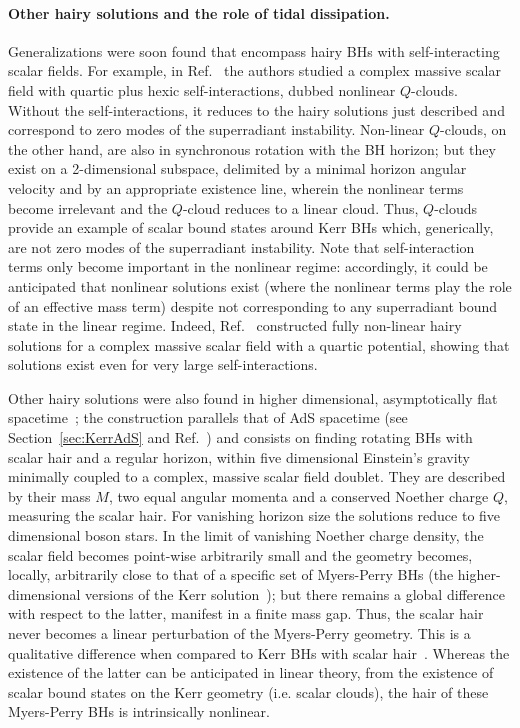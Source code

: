 \documentclass[11pt]{article}
\numberwithin{equation}{section} %
\begin{document}
\paragraph{Other hairy solutions and the role of tidal dissipation.}
Generalizations were soon found that encompass hairy BHs with self-interacting scalar fields.
For example, in Ref.~\cite{Herdeiro:2014pka} the authors studied a complex massive scalar field with quartic plus hexic 
self-interactions, dubbed nonlinear $Q$-clouds.
Without the self-interactions, it reduces to the hairy solutions just described and correspond to zero modes of the 
superradiant instability. Non-linear $Q$-clouds, on the other hand, are also in synchronous rotation with the BH 
horizon; but they exist on a 2-dimensional subspace, delimited by a minimal horizon angular velocity and by an 
appropriate existence line, wherein the nonlinear terms become irrelevant and the $Q$-cloud reduces to a linear cloud. 
Thus, $Q$-clouds provide an example of scalar bound states around Kerr BHs which, generically, are not zero modes of the 
superradiant instability. Note that self-interaction terms only become important in the nonlinear regime:
accordingly, it could be anticipated that nonlinear solutions exist (where the nonlinear terms play the role of an 
effective mass term) despite not corresponding to any superradiant bound state in the linear regime. Indeed, Ref.~\cite{Herdeiro:2015tia} constructed fully non-linear hairy solutions for a complex massive scalar field with a quartic potential, showing that solutions exist even for very large self-interactions.


Other hairy solutions were also found in higher dimensional, asymptotically flat spacetime~\cite{Brihaye:2014nba};
the construction parallels that of AdS spacetime (see Section~\ref{sec:KerrAdS} and Ref.~\cite{Dias:2011at}) and 
consists on finding
rotating BHs with scalar hair and a regular horizon, within five dimensional Einstein's gravity minimally coupled to a 
complex, massive scalar field doublet. They are described by their mass $M$, two equal angular momenta and a conserved 
Noether charge $Q$, measuring the scalar hair. For vanishing horizon size the solutions reduce to five dimensional boson 
stars. In the limit of vanishing Noether charge density, the scalar field becomes point-wise arbitrarily small and the 
geometry becomes, locally, arbitrarily close to that of a specific set of Myers-Perry BHs (the higher-dimensional 
versions of the Kerr solution~\cite{Myers:1986un}); but there remains a global difference with respect to the latter, 
manifest in a finite mass gap. Thus, the scalar hair never becomes a linear perturbation of the Myers-Perry geometry. 
This is a qualitative difference when compared to Kerr BHs with scalar hair~\cite{Herdeiro:2014goa}. Whereas the 
existence of the latter can be anticipated in linear theory, from the existence of scalar bound states on the Kerr 
geometry (i.e. scalar clouds), the hair of these Myers-Perry BHs is intrinsically nonlinear. 
\end{document}
